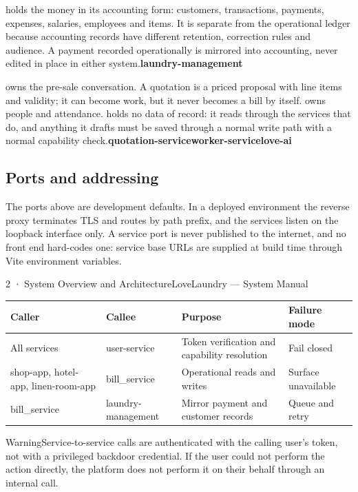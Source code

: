 \documentclass[11pt,a4paper,oneside]{book}
\begin{document}
holds the money in its accounting form: customers, transactions, payments, expenses, salaries, employees and items. It is separate from the operational ledger because accounting records have different retention, correction rules and audience. A payment recorded operationally is mirrored into accounting, never edited in place in either system.\textbf{laundry-management}

owns the pre-sale conversation. A quotation is a priced proposal with line items and validity; it can become work, but it never becomes a bill by itself.  owns people and attendance.  holds no data of record: it reads through the services that do, and anything it drafts must be saved through a normal write path with a normal capability check.\textbf{quotation-service}\textbf{worker-service}\textbf{love-ai}

\subsection*{Ports and addressing}
The ports above are development defaults. In a deployed environment the reverse proxy terminates TLS and routes by path prefix, and the services listen on the loopback interface only. A service port is never published to the internet, and no front end hard-codes one: service base URLs are supplied at build time through Vite environment variables.

2 · System Overview and ArchitectureLoveLaundry — System Manual

\begin{center}\small
\begin{tabularx}{\linewidth}{|X|X|X|X|}
\hline
\rowcolor{lightgrey}
\textbf{Caller} & \textbf{Callee} & \textbf{Purpose} & \textbf{Failure mode} \\ \hline
All services & user-service & Token verification and capability resolution & Fail closed \\ \hline
shop-app, hotel-app, linen-room-app & bill\_service & Operational reads and writes & Surface unavailable \\ \hline
bill\_service & laundry-management & Mirror payment and customer records & Queue and retry \\ \hline
\end{tabularx}
\end{center}
\begin{notebox}WarningService-to-service calls are authenticated with the calling user's token, not with a privileged backdoor credential. If the user could not perform the action directly, the platform does not perform it on their behalf through an internal call.\end{notebox}
\end{document}

